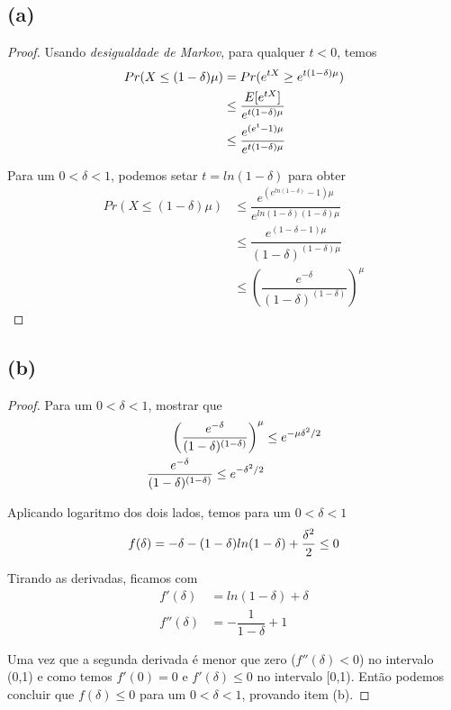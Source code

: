 \documentclass{article}
\begin{document}
\subsection*{(a)}
\begin{proof}
	Usando \emph{desigualdade de Markov}, para qualquer $t < 0$, temos
	\begin{equation}
		\notag
		\begin{split}
			Pr(X \leq (1-\delta)\mu) & = Pr(e^{tX} \geq e^{t(1-\delta)\mu})\\
			&\leq \dfrac{E[e^{tX}]}{e^{t(1-\delta)\mu}}\\
			&\leq \dfrac{e^{(e^t-1)\mu}}{e^{t(1-\delta)\mu}}
		\end{split}
	\end{equation}

	Para um $0 < \delta < 1$, podemos setar $t = ln(1-\delta)$ para obter
	\begin{equation}
		\begin{split}
			Pr(X \leq (1-\delta)\mu) &\leq \dfrac{e^{(e^{ln(1-\delta)}-1)\mu}}{e^{ln(1 - \delta)(1-\delta)\mu}}\\
			&\leq \dfrac{e^{(1-\delta - 1)\mu}}{(1-\delta)^{(1-\delta)\mu}}\\
			&\leq \left(\dfrac{e^{-\delta}}{(1-\delta)^{(1-\delta)}}\right)^{\mu}
		\end{split}
	\end{equation}
\end{proof}

\subsection*{(b)}
\begin{proof}
	Para um $0 < \delta < 1$, mostrar que
	\begin{equation}
		\notag
		\begin{split}
			\left(\dfrac{e^{-\delta}}{(1-\delta)^{(1-\delta)}} \right)^{\mu} &\leq e^{-\mu\delta^2/2}\\
			\dfrac{e^{-\delta}}{(1-\delta)^{(1-\delta)}} \leq e^{-\delta^2/2}
		\end{split}
	\end{equation}

	Aplicando logaritmo dos dois lados, temos para um $0 < \delta < 1$
	\begin{equation}
		\notag
		f(\delta) = -\delta - (1-\delta)ln(1-\delta) + \dfrac{\delta^2}{2} \leq 0
	\end{equation}

	Tirando as derivadas, ficamos com
	\begin{equation}
		\begin{split}
			f'(\delta) &= ln(1-\delta) + \delta\\
			f''(\delta) &= -\dfrac{1}{1-\delta} + 1
		\end{split}
	\end{equation}

	Uma vez que a segunda derivada é menor que zero ($f''(\delta)<0$) no intervalo (0,1) e
	como temos $f'(0) = 0$ e $f'(\delta)\leq 0$ no intervalo [0,1). Então podemos concluir que
	$f(\delta) \leq 0$ para um $0 < \delta < 1$, provando item (b).
\end{proof}
\end{document}
